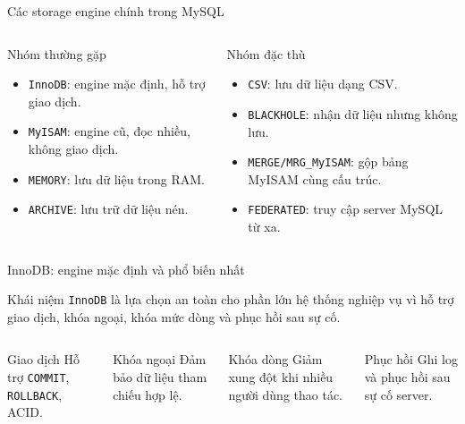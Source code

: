 \documentclass[aspectratio=169,11pt]{beamer}
\newcommand{\code}[1]{\texttt{#1}}
\newcommand{\smallitem}{\setlength{\itemsep}{2pt}}
\begin{document}
\begin{frame}{Các storage engine chính trong MySQL}
\begin{columns}[T,onlytextwidth]
\begin{block}{Nhóm thường gặp}
\begin{itemize}\smallitem
  \item \code{InnoDB}: engine mặc định, hỗ trợ giao dịch.
  \item \code{MyISAM}: engine cũ, đọc nhiều, không giao dịch.
  \item \code{MEMORY}: lưu dữ liệu trong RAM.
  \item \code{ARCHIVE}: lưu trữ dữ liệu nén.
\end{itemize}
\end{block}
\begin{block}{Nhóm đặc thù}
\begin{itemize}\smallitem
  \item \code{CSV}: lưu dữ liệu dạng CSV.
  \item \code{BLACKHOLE}: nhận dữ liệu nhưng không lưu.
  \item \code{MERGE/MRG\_MyISAM}: gộp bảng MyISAM cùng cấu trúc.
  \item \code{FEDERATED}: truy cập server MySQL từ xa.
\end{itemize}
\end{block}
\end{columns}
\end{frame}

\begin{frame}{InnoDB: engine mặc định và phổ biến nhất}
\begin{block}{Khái niệm}
\code{InnoDB} là lựa chọn an toàn cho phần lớn hệ thống nghiệp vụ vì hỗ trợ giao dịch, khóa ngoại, khóa mức dòng và phục hồi sau sự cố.
\end{block}
\begin{columns}[T,onlytextwidth]
\begin{block}{Giao dịch}
\small Hỗ trợ \code{COMMIT}, \code{ROLLBACK}, ACID.
\end{block}
\begin{block}{Khóa ngoại}
\small Đảm bảo dữ liệu tham chiếu hợp lệ.
\end{block}
\begin{block}{Khóa dòng}
\small Giảm xung đột khi nhiều người dùng thao tác.
\end{block}
\begin{block}{Phục hồi}
\small Ghi log và phục hồi sau sự cố server.
\end{block}
\end{columns}
\end{frame}
\end{document}
